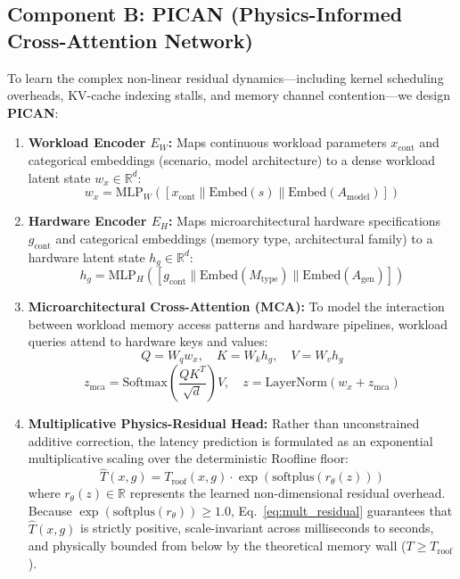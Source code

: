 \documentclass[3p,12pt]{elsarticle}
\begin{document}
\subsection{Component B: PICAN (Physics-Informed Cross-Attention Network)}
To learn the complex non-linear residual dynamics---including kernel scheduling overheads, KV-cache indexing stalls, and memory channel contention---we design \textbf{PICAN}:

\begin{enumerate}
    \item \textbf{Workload Encoder $E_W$:} Maps continuous workload parameters $x_{\text{cont}}$ and categorical embeddings (scenario, model architecture) to a dense workload latent state $w_x \in \mathbb{R}^d$:
    \begin{equation}
    w_x = \text{MLP}_W\left( [x_{\text{cont}} \parallel \text{Embed}(s) \parallel \text{Embed}(A_{\text{model}})] \right)
    \end{equation}
    \item \textbf{Hardware Encoder $E_H$:} Maps microarchitectural hardware specifications $g_{\text{cont}}$ and categorical embeddings (memory type, architectural family) to a hardware latent state $h_g \in \mathbb{R}^d$:
    \begin{equation}
    h_g = \text{MLP}_H\left( [g_{\text{cont}} \parallel \text{Embed}(M_{\text{type}}) \parallel \text{Embed}(A_{\text{gen}})] \right)
    \end{equation}
    \item \textbf{Microarchitectural Cross-Attention (MCA):} To model the interaction between workload memory access patterns and hardware pipelines, workload queries attend to hardware keys and values:
    \begin{equation}
    Q = W_q w_x, \quad K = W_k h_g, \quad V = W_v h_g
    \end{equation}
    \begin{equation}
    z_{\text{mca}} = \text{Softmax}\left(\frac{Q K^T}{\sqrt{d}}\right) V, \quad z = \text{LayerNorm}(w_x + z_{\text{mca}})
    \end{equation}
    \item \textbf{Multiplicative Physics-Residual Head:} Rather than unconstrained additive correction, the latency prediction is formulated as an exponential multiplicative scaling over the deterministic Roofline floor:
    \begin{equation}
    \label{eq:mult_residual}
    \hat{T}(x, g) = T_{\text{roof}}(x, g) \cdot \exp\left(\text{softplus}(r_\theta(z))\right)
    \end{equation}
    where $r_\theta(z) \in \mathbb{R}$ represents the learned non-dimensional residual overhead. Because $\exp(\text{softplus}(r_\theta)) \ge 1.0$, Eq.~\eqref{eq:mult_residual} guarantees that $\hat{T}(x, g)$ is strictly positive, scale-invariant across milliseconds to seconds, and physically bounded from below by the theoretical memory wall ($T \ge T_{\text{roof}}$).
    

\end{enumerate}
\end{document}
